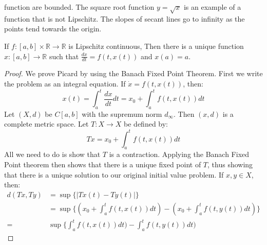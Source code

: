 \documentclass[crop=false,class=article,oneside]{standalone}
\begin{document}
            function are bounded. The square root
            function $y=\sqrt{x}$ is an example
            of a function that is not Lipschitz. The
            slopes of secant lines go to infinity
            as the points tend towards the origin.
            \begin{theorem}
                If $f:[a,b]\times\mathbb{R}%
                    \rightarrow\mathbb{R}$
                is Lipschitz continuous,
                Then there is a unique function
                $x:[a,b]\rightarrow\mathbb{R}$
                such that
                $\frac{dx}{dt}=f(t,x(t))$ and $x(a)=a$.
            \end{theorem}
            \begin{proof}
                We prove Picard by using the
                Banach Fixed Point Theorem. First
                we write the problem as an integral
                equation.
                If $\dot{x}=f(t,x(t))$, then:
                \begin{equation*}
                    x(t)
                    =\int_{a}^{t}\frac{dx}{dt}dt
                    =x_{0}+\int_{a}^{t}f(t,x(t))dt
                \end{equation*}
                Let $(X,d)$ be $C[a,b]$ with the
                supremum norm $d_{\infty}$. Then
                $(x,d)$ is a complete metric space.
                Let $T:{X}\rightarrow{X}$ be defined
                by:
                \begin{equation*}
                    Tx=x_{0}+\int_{a}^{t}f(t,x(t))dt
                \end{equation*}
                All we need to do is show that $T$ is
                a contraction. Applying the
                Banach Fixed Point theorem then
                shows that there is a unique
                fixed point of $T$, thus showing
                that there is a unique solution
                to our original initial value problem.
                If $x,y\in{X}$, then:
                \begin{align*}
                    d(Tx,Ty)
                    &=\sup\{|Tx(t)-Ty(t)|\}\\
                    &=\sup\{
                        (x_{0}+
                         \int_{a}^{t}f(t,x(t))dt)
                       -(x_{0}+
                         \int_{a}^{t}f(t,y(t))dt)
                    \}\\
                    =&\sup\{
                        \int_{a}^{t}f(t,x(t))dt)-
                        \int_{a}^{t}f(t,y(t))dt)

\end{align*}
\end{proof}
\end{document}

